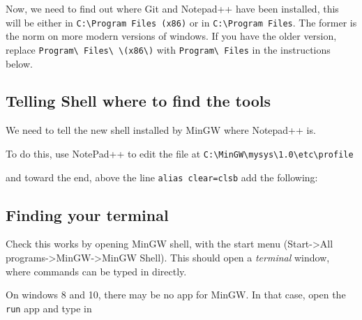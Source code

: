 Now, we need to find out where Git and Notepad++ have been installed,
this will be either in \texttt{C:\textbackslash{}Program Files (x86)} or
in \texttt{C:\textbackslash{}Program Files}. The former is the norm on
more modern versions of windows. If you have the older version, replace
\texttt{Program\textbackslash{} Files\textbackslash{} \textbackslash{}(x86\textbackslash{})}
with \texttt{Program\textbackslash{} Files} in the instructions below.

\subsection{Telling Shell where to find the
tools}\label{telling-shell-where-to-find-the-tools}

We need to tell the new shell installed by MinGW where Notepad++ is.

To do this, use NotePad++ to edit the file at
\texttt{C:\textbackslash{}MinGW\textbackslash{}mysys\textbackslash{}1.0\textbackslash{}etc\textbackslash{}profile}

and toward the end, above the line \texttt{alias clear=clsb} add the
following:

\begin{Shaded}
\begin{Highlighting}[]
 \DataTypeTok{\textbackslash{} }\DataTypeTok{\textbackslash{} \textbackslash{}(}\DataTypeTok{\textbackslash{})}
\end{Highlighting}
\end{Shaded}

\subsection{Finding your terminal}\label{finding-your-terminal}

Check this works by opening MinGW shell, with the start menu
(Start-\textgreater{}All
programs-\textgreater{}MinGW-\textgreater{}MinGW Shell). This should
open a \emph{terminal} window, where commands can be typed in directly.

On windows 8 and 10, there may be no app for MinGW. In that case, open
the \texttt{run} app and type in

\begin{Shaded}
\begin{Highlighting}[]
\end{Highlighting}
\end{Shaded}

